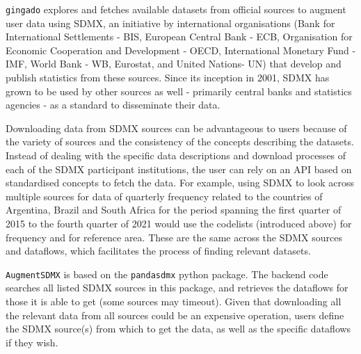 \documentclass{article}
\begin{document}
\texttt{gingado} explores and fetches available datasets from official sources to augment user data using SDMX, an initiative by international organisations (Bank for International Settlements - BIS, European Central Bank - ECB, Organisation for Economic Cooperation and Development - OECD, International Monetary Fund - IMF, World Bank - WB, Eurostat, and United Nations- UN) that develop and publish statistics from these sources. Since its inception in 2001, SDMX has grown to be used by other sources as well - primarily central banks and statistics agencies - as a standard to disseminate their data.

Downloading data from SDMX sources can be advantageous to users because of the variety of sources and the consistency of the concepts describing the datasets. Instead of dealing with the specific data descriptions and download processes of each of the SDMX participant institutions, the user can rely on an API based on standardised concepts to fetch the data. For example, using SDMX to look across multiple sources for data of quarterly frequency related to the countries of Argentina, Brazil and South Africa for the period spanning the first quarter of 2015 to the fourth quarter of 2021 would use the codelists (introduced above) for frequency and for reference area. These are the same across the SDMX sources and dataflows, which facilitates the process of finding relevant datasets.

\texttt{AugmentSDMX} is based on the \texttt{pandasdmx} python package. The backend code searches all listed SDMX sources in this package, and retrieves the dataflows for those it is able to get (some sources may timeout). Given that downloading all the relevant data from all sources could be an expensive operation, users define the SDMX source(s) from which to get the data, as well as the specific dataflows if they wish.
\end{document}
